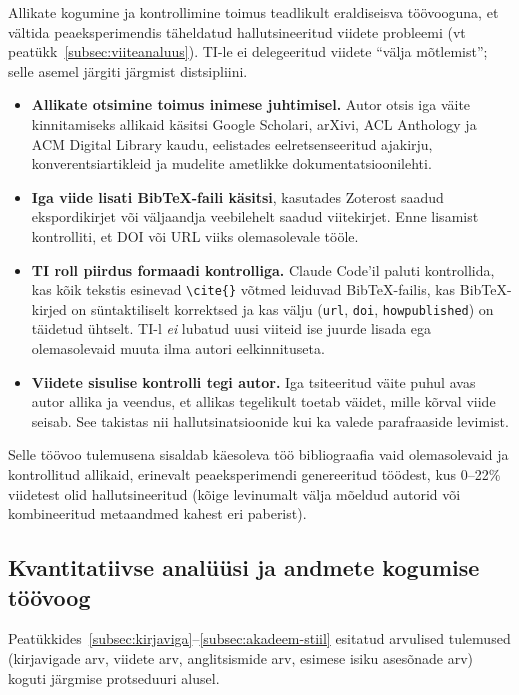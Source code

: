 Allikate kogumine ja kontrollimine toimus teadlikult eraldiseisva töövooguna, et vältida peaeksperimendis täheldatud hallutsineeritud viidete probleemi (vt peatükk~\ref{subsec:viiteanaluus}). TI-le ei delegeeritud viidete ``välja mõtlemist''; selle asemel järgiti järgmist distsipliini.

\begin{itemize}
    \item \textbf{Allikate otsimine toimus inimese juhtimisel.} Autor otsis iga väite kinnitamiseks allikaid käsitsi Google Scholari, arXivi, ACL Anthology ja ACM Digital Library kaudu, eelistades eelretsenseeritud ajakirju, konverentsiartikleid ja mudelite ametlikke dokumentatsioonilehti.
    \item \textbf{Iga viide lisati BibTeX-faili käsitsi}, kasutades Zoterost saadud ekspordikirjet või väljaandja veebilehelt saadud viitekirjet. Enne lisamist kontrolliti, et DOI või URL viiks olemasolevale tööle.
    \item \textbf{TI roll piirdus formaadi kontrolliga.} Claude Code'il paluti kontrollida, kas kõik tekstis esinevad \texttt{\textbackslash cite\{\}} võtmed leiduvad BibTeX-failis, kas BibTeX-kirjed on süntaktiliselt korrektsed ja kas välju (\texttt{url}, \texttt{doi}, \texttt{howpublished}) on täidetud ühtselt. TI-l \emph{ei} lubatud uusi viiteid ise juurde lisada ega olemasolevaid muuta ilma autori eelkinnituseta.
    \item \textbf{Viidete sisulise kontrolli tegi autor.} Iga tsiteeritud väite puhul avas autor allika ja veendus, et allikas tegelikult toetab väidet, mille kõrval viide seisab. See takistas nii hallutsinatsioonide kui ka valede parafraaside levimist.
\end{itemize}

Selle töövoo tulemusena sisaldab käesoleva töö bibliograafia vaid olemasolevaid ja kontrollitud allikaid, erinevalt peaeksperimendi genereeritud töödest, kus 0--22\% viidetest olid hallutsineeritud (kõige levinumalt välja mõeldud autorid või kombineeritud metaandmed kahest eri paberist).

\subsection{Kvantitatiivse analüüsi ja andmete kogumise töövoog} \label{subsec:kvantanaluus-toovoog}

Peatükkides~\ref{subsec:kirjaviga}--\ref{subsec:akadeem-stiil} esitatud arvulised tulemused (kirjavigade arv, viidete arv, anglitsismide arv, esimese isiku asesõnade arv) koguti järgmise protseduuri alusel.

